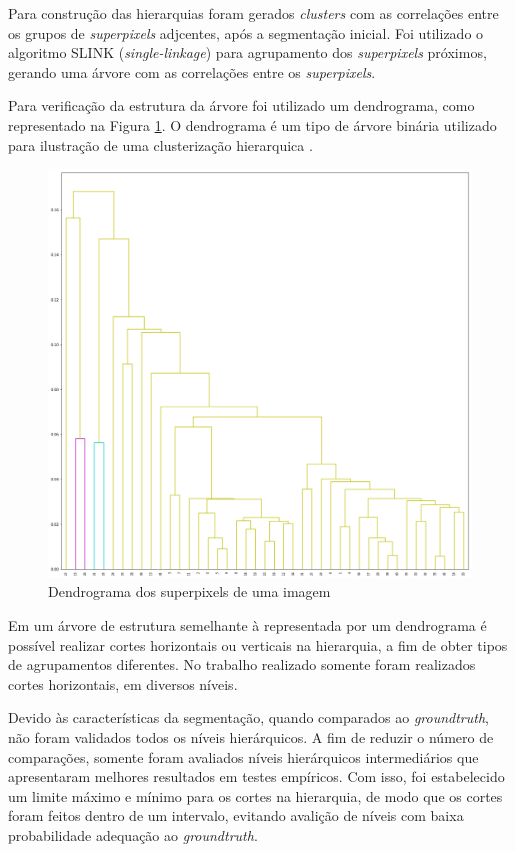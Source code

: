 \begin{document}
Para construção das hierarquias foram gerados \textit{clusters} com as correlações entre os grupos de \textit{superpixels} adjcentes, após a segmentação inicial. Foi utilizado o algoritmo SLINK (\textit{single-linkage}) para agrupamento dos \textit{superpixels} próximos, gerando uma árvore com as correlações entre os \textit{superpixels}.

Para verificação da estrutura da árvore foi utilizado um dendrograma, como representado na Figura \ref{fig:DENDROGRAM}. O dendrograma é um tipo de árvore binária utilizado para ilustração de uma clusterização hierarquica \cite{SINGLE_LINKAGE}.

\begin{figure}[ht]
\centering
\includegraphics[width=1.\textwidth]{dendrogram.png}
\caption{Dendrograma dos superpixels de uma imagem}
\label{fig:DENDROGRAM}
\end{figure}

Em um árvore de estrutura semelhante à representada por um dendrograma é possível realizar cortes horizontais ou verticais na hierarquia, a fim de obter tipos de agrupamentos diferentes. No trabalho realizado somente foram realizados cortes horizontais, em diversos níveis. 

Devido às características da segmentação, quando comparados ao \textit{groundtruth}, não foram validados todos os níveis hierárquicos. A fim de reduzir o número de comparações, somente foram avaliados níveis hierárquicos intermediários que apresentaram melhores resultados em testes empíricos. Com isso, foi estabelecido um limite máximo e mínimo para os cortes na hierarquia, de modo que os cortes foram feitos dentro de um intervalo, evitando avalição de níveis com baixa probabilidade adequação ao \textit{groundtruth}.
\end{document}
